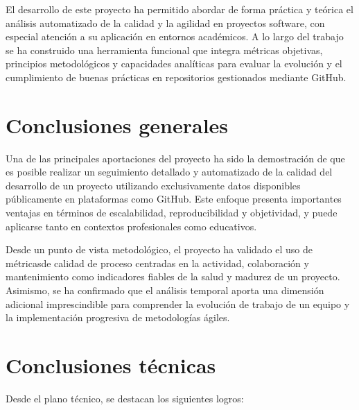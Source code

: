 
El desarrollo de este proyecto ha permitido abordar de forma práctica y teórica el análisis automatizado de la calidad y la agilidad en proyectos software, con especial atención a su aplicación en entornos académicos. A lo largo del trabajo se ha construido una herramienta funcional que integra métricas objetivas, principios metodológicos y capacidades analíticas para evaluar la evolución y el cumplimiento de buenas prácticas en repositorios gestionados mediante GitHub.

\section*{Conclusiones generales}

Una de las principales aportaciones del proyecto ha sido la demostración de que es posible realizar un seguimiento detallado y automatizado de la calidad del desarrollo de un proyecto utilizando exclusivamente datos disponibles públicamente en plataformas como GitHub. Este enfoque presenta importantes ventajas en términos de escalabilidad, reproducibilidad y objetividad, y puede aplicarse tanto en contextos profesionales como educativos.

Desde un punto de vista metodológico, el proyecto ha validado el uso de métricasde calidad de proceso centradas en la actividad, colaboración y mantenimiento como indicadores fiables de la salud y madurez de un proyecto. Asimismo, se ha confirmado que el análisis temporal aporta una dimensión adicional imprescindible para comprender la evolución de trabajo de un equipo y la implementación progresiva de metodologías ágiles.

\section*{Conclusiones técnicas}

Desde el plano técnico, se destacan los siguientes logros:

